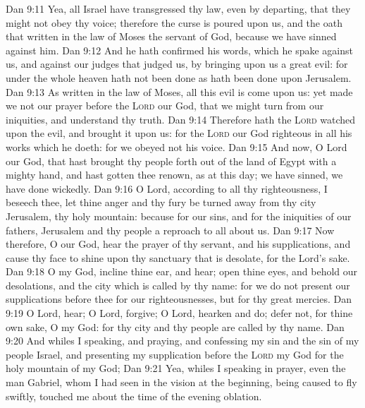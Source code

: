 \vs Dan 9:11 Yea, all Israel have transgressed thy law, even by departing, that they might not obey thy voice; therefore the curse is poured upon us, and the oath that  written in the law of Moses the servant of God, because we have sinned against him.
\vs Dan 9:12 And he hath confirmed his words, which he spake against us, and against our judges that judged us, by bringing upon us a great evil: for under the whole heaven hath not been done as hath been done upon Jerusalem.
\vs Dan 9:13 As  written in the law of Moses, all this evil is come upon us: yet made we not our prayer before the \textsc{Lord} our God, that we might turn from our iniquities, and understand thy truth.
\vs Dan 9:14 Therefore hath the \textsc{Lord} watched upon the evil, and brought it upon us: for the \textsc{Lord} our God  righteous in all his works which he doeth: for we obeyed not his voice.
\vs Dan 9:15 And now, O Lord our God, that hast brought thy people forth out of the land of Egypt with a mighty hand, and hast gotten thee renown, as at this day; we have sinned, we have done wickedly.
\vs Dan 9:16 O Lord, according to all thy righteousness, I beseech thee, let thine anger and thy fury be turned away from thy city Jerusalem, thy holy mountain: because for our sins, and for the iniquities of our fathers, Jerusalem and thy people  a reproach to all  about us.
\vs Dan 9:17 Now therefore, O our God, hear the prayer of thy servant, and his supplications, and cause thy face to shine upon thy sanctuary that is desolate, for the Lord's sake.
\vs Dan 9:18 O my God, incline thine ear, and hear; open thine eyes, and behold our desolations, and the city which is called by thy name: for we do not present our supplications before thee for our righteousnesses, but for thy great mercies.
\vs Dan 9:19 O Lord, hear; O Lord, forgive; O Lord, hearken and do; defer not, for thine own sake, O my God: for thy city and thy people are called by thy name.
\vs Dan 9:20 And whiles I  speaking, and praying, and confessing my sin and the sin of my people Israel, and presenting my supplication before the \textsc{Lord} my God for the holy mountain of my God;
\vs Dan 9:21 Yea, whiles I  speaking in prayer, even the man Gabriel, whom I had seen in the vision at the beginning, being caused to fly swiftly, touched me about the time of the evening oblation.
